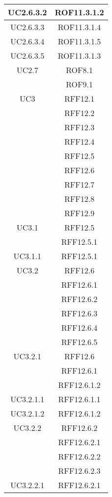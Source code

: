 \begin{longtable}{|c|c|}
\midrule
UC2.6.3.2
& ROF11.3.1.2\\

\midrule
UC2.6.3.3
& ROF11.3.1.4\\

\midrule
UC2.6.3.4
& ROF11.3.1.5\\

\midrule
UC2.6.3.5
& ROF11.3.1.3\\

\midrule
UC2.7
& ROF8.1\\
& ROF9.1\\


\midrule
UC3
& RFF12.1\\
& RFF12.2\\
& RFF12.3\\
& RFF12.4\\
& RFF12.5\\
& RFF12.6\\
& RFF12.7\\
& RFF12.8\\
& RFF12.9\\

\midrule
UC3.1
& RFF12.5\\
& RFF12.5.1\\


\midrule
UC3.1.1
& RFF12.5.1\\

\midrule
UC3.2
& RFF12.6\\
& RFF12.6.1\\
& RFF12.6.2\\
& RFF12.6.3\\
& RFF12.6.4\\
& RFF12.6.5\\

\midrule
UC3.2.1
& RFF12.6\\
& RFF12.6.1\\
& RFF12.6.1.2\\

\midrule
UC3.2.1.1
& RFF12.6.1.1\\

\midrule
UC3.2.1.2
& RFF12.6.1.2\\

\midrule
UC3.2.2
& RFF12.6.2\\
& RFF12.6.2.1\\
& RFF12.6.2.2\\
& RFF12.6.2.3\\

\midrule
UC3.2.2.1
& RFF12.6.2.1\\


\end{longtable}
